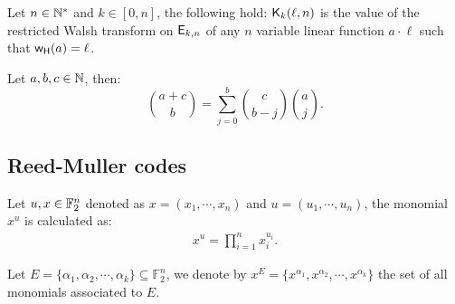 \documentclass[11pt]{llncs}
\begin{document}
\begin{Prop}\label{prop:Kr}
	Let $n\in \mathbb{N}^*$ and $k\in [0,n]$, the following hold:
 $\mathsf{K}_{k}(\ell,n)$ is the value of the restricted Walsh transform on $\mathsf{E}_{k,n}$ of any $n$ variable linear function $a\cdot \ell$ such that $\mathsf{w_H}(a)=\ell$.
\end{Prop}


\begin{Prop}\label{prop:Vandermonde}
	Let $a,b,c \in \mathbb{N}$, then:
	\begin{equation*}
	\binom{a+c}{b}=\sum_{j=0}^b\binom{c}{b-j}  \binom{a}{j}.
	\end{equation*}
\end{Prop}



\fi


\subsection{Reed-Muller codes}

\begin{definition}
    Let $u, x\in \mathbb{F}_2^n$ denoted as $x=(x_1,\cdots,x_n)$ and $u=(u_1,\cdots,u_n)$, the monomial $x^{u}$ is calculated as:
    \begin{align*}
        x^{u} = \prod_{i=1}^n x_i^{u_i}.
    \end{align*}
    
    Let $E = \{\alpha_1, \alpha_2, \cdots, \alpha_k\} \subseteq \mathbb{F}_2^n$, we denote by $x^E = \{x^{\alpha_1}, x^{\alpha_2}, \cdots, x^{\alpha_k}\}$ the set of all monomials associated to $E$.
\end{definition}
\end{document}
